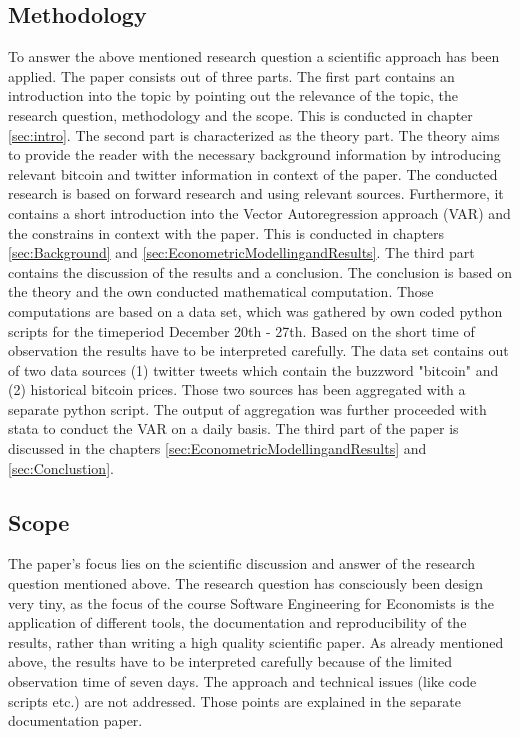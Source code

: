 \documentclass[a4paper,american,12pt]{article}
\begin{document}
\begin{spacing}{1.2}
\subsection{Methodology}
\label{sec:Methodology}
To answer the above mentioned research question a scientific approach has been applied. The paper consists out of three parts. The first part contains an introduction into the topic by pointing out the relevance of the topic, the research question, methodology and the scope. This is conducted in chapter \ref{sec:intro}. The second part is characterized as the theory part. The theory aims to provide the reader with the necessary background information by introducing relevant bitcoin and twitter information in context of the paper. The conducted research is based on forward research and using relevant sources. Furthermore, it contains a short introduction into the Vector Autoregression approach (VAR) and the constrains in context with the paper. This is conducted in chapters \ref{sec:Background} and \ref{sec:EconometricModellingandResults}. The third part contains the discussion of the results and a conclusion. The conclusion is based on the theory and the own conducted mathematical computation. Those computations are based on a data set, which was gathered by own coded python scripts for the timeperiod December 20th - 27th. Based on the short time of observation the results have to be interpreted carefully. The data set contains out of two data sources (1) twitter tweets which contain the buzzword "bitcoin" and (2) historical bitcoin prices. Those two sources has been aggregated with a separate python script. The output of aggregation was further proceeded with stata to conduct the VAR on a daily basis. The third part of the paper is discussed in the chapters \ref{sec:EconometricModellingandResults} and \ref{sec:Conclustion}.

\subsection{Scope}
\label{sec:Scope}
The paper's focus lies on the scientific discussion and answer of the research question mentioned above. The research question has consciously been design very tiny, as the focus of the course Software Engineering for Economists is the application of different tools, the documentation and reproducibility of the results, rather than writing a high quality scientific paper. As already mentioned above, the results have to be interpreted carefully because of the limited observation time of seven days. The approach and technical issues (like code scripts etc.) are not addressed. Those points are explained in the separate documentation paper.


\end{spacing}
\end{document}
